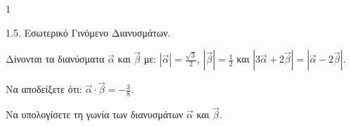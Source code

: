 \begin{ylh}{1}
    \item 1.5. Εσωτερικό Γινόμενο Διανυσμάτων.
\end{ylh}
Δίνονται τα διανύσματα $\vec{\alpha}$ και $\vec{\beta}$ με: $|\vec{\alpha}| = \frac{\sqrt{3}}{2}$, $|\vec{\beta}| = \frac{1}{2}$ και $|3\vec{\alpha} + 2\vec{\beta}| = |\vec{\alpha} - 2\vec{\beta}|.$
\begin{alist}
\item Να αποδείξετε ότι: $\vec{\alpha} \cdot \vec{\beta} = -\frac{3}{8}$. 
\item Να υπολογίσετε τη γωνία των διανυσμάτων $\vec{\alpha}$ και $\vec{\beta}$. 
\end{alist}